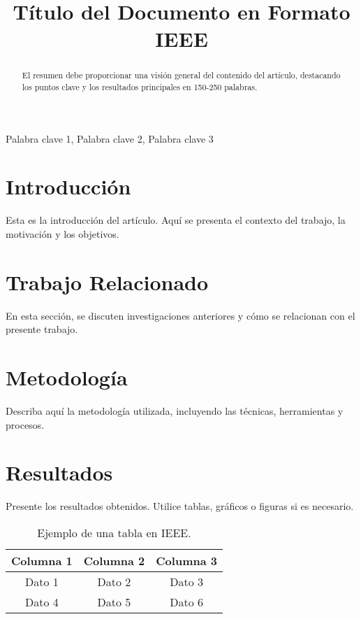 \documentclass[conference]{IEEEtran}
\begin{document}
\title{Título del Documento en Formato IEEE}

\author{
}

\maketitle

\begin{abstract}
El resumen debe proporcionar una visión general del contenido del artículo, destacando los puntos clave y los resultados principales en 150-250 palabras.
\end{abstract}

\begin{IEEEkeywords}
Palabra clave 1, Palabra clave 2, Palabra clave 3
\end{IEEEkeywords}

\section{Introducción}
Esta es la introducción del artículo. Aquí se presenta el contexto del trabajo, la motivación y los objetivos.

\section{Trabajo Relacionado}
En esta sección, se discuten investigaciones anteriores y cómo se relacionan con el presente trabajo.

\section{Metodología}
Describa aquí la metodología utilizada, incluyendo las técnicas, herramientas y procesos.

\section{Resultados}
Presente los resultados obtenidos. Utilice tablas, gráficos o figuras si es necesario.

\begin{table}[ht]
\caption{Ejemplo de una tabla en IEEE.}
\centering
\begin{tabular}{|c|c|c|}
\hline
Columna 1 & Columna 2 & Columna 3 \\ \hline
Dato 1    & Dato 2    & Dato 3    \\ \hline
Dato 4    & Dato 5    & Dato 6    \\ \hline
\end{tabular}
\end{table}
\end{document}
